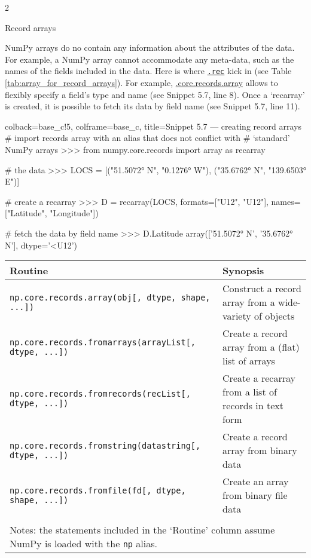 \documentclass[a4paper,11pt]{book}
\numberwithin{figure}{chapter}
\numberwithin{table}{chapter}
\newcommand{\question}[1]{%
    \begin{tcolorbox}[colback=comp_c!10,colframe=comp_c,sidebyside align=top,width=\linewidth,before skip=1ex]
        #1
    \end{tcolorbox}
    \switchcolumn%
}
\newcommand{\note}[1]{%
    \begin{tcolorbox}[colback=white!0,colframe=white!10,width=\linewidth,before skip=1ex]
        #1
    \end{tcolorbox}
}
\begin{document}
\begin{paracol}{2}
	\question{\raggedright Record arrays}
	\note{NumPy arrays do no contain any information about the attributes of the data. For example, a NumPy array cannot accommodate any meta-data, such as the names of the fields included in the data. Here is where \href{https://numpy.org/doc/stable/reference/routines.array-creation.html}{\texttt{.rec}} kick in (see Table \ref{tab:array_for_record_arrays}). For example, \href{https://numpy.org/doc/stable/reference/generated/numpy.core.records.array.html\#numpy.core.records.array}{.core.records.array} allows to flexibly specify a field's type and name (see Snippet 5.7, line 8). Once a `recarray' is created, it is possible to fetch its data by field name (see Snippet 5.7, line 11).}
\end{paracol}

\begin{pythoncode}[linenos=true,]{colback=base_c!5, colframe=base_c, title=\sffamily Snippet 5.7 --- creating record arrays}
# import records array with an alias that does not conflict with
# `standard' NumPy arrays
>>> from numpy.core.records import array as recarray

# the data
>>> LOCS = [("51.5072° N", "0.1276° W"), ("35.6762° N", "139.6503° E")]

# create a recarray
>>> D = recarray(LOCS, formats=["U12", "U12"], names=["Latitude", "Longitude"])

# fetch the data by field name
>>> D.Latitude
array(['51.5072° N', '35.6762° N'], dtype='<U12')
\end{pythoncode}

\begin{sidewaystable}[!htbp]
	\centering
	\caption{Routines for Creating Record Arrays}
	\label{tab:array_for_record_arrays}
	\begin{tabular}{lp{12cm}}
		\toprule \toprule
			Routine & Synopsis \\
			\midrule
			\texttt{np.core.records.array(obj[, dtype, shape, ...])} &
			Construct a record array from a wide-variety of objects\\
			\texttt{np.core.records.fromarrays(arrayList[, dtype, ...])} &
			Create a record array from a (flat) list of arrays\\
			\texttt{np.core.records.fromrecords(recList[, dtype, ...])} &
			Create a recarray from a list of records in text form\\
			\texttt{np.core.records.fromstring(datastring[, dtype, ...])} &
			Create a record array from binary data\\
			\texttt{np.core.records.fromfile(fd[, dtype, shape, ...])} &
			Create an array from binary file data\\
			\bottomrule \\[-1.8ex]
		    \multicolumn{2}{l}{Notes: the statements included in the `Routine' column assume NumPy is loaded with the \texttt{np} alias.} \\
	\end{tabular}
\end{sidewaystable}
\clearpage
\end{document}
